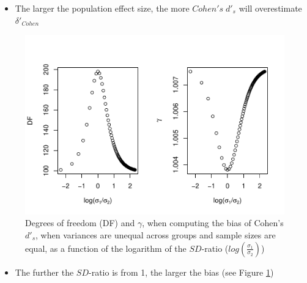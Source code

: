 \documentclass[
  man]{apa6}
\providecommand{\tightlist}{%
  \setlength{\itemsep}{0pt}\setlength{\parskip}{0pt}}
\begin{document}
\begin{itemize}
\tightlist
\item
  The larger the population effect size, the more \(Cohen's \; d'_s\) will overestimate \(\delta'_{Cohen}\)
\end{itemize}

\begin{figure}
\centering
\includegraphics{Theoretical-Bias-of-all-estimators-as-a-function-of-population-parameters_files/figure-latex/biascohendprimehetbalSDratio2-1.pdf}
\caption{\label{fig:biascohendprimehetbalSDratio2}Degrees of freedom (DF) and \(\gamma\), when computing the bias of Cohen's \(d'_s\), when variances are unequal across groups and sample sizes are equal, as a function of the logarithm of the \(SD\)-ratio (\(log \left( \frac{\sigma_1}{\sigma_2} \right)\))}
\end{figure}

\begin{itemize}
\tightlist
\item
  The further the \(SD\)-ratio is from 1, the larger the bias (see Figure \ref{fig:biascohendprimehetbalSDratio2})
\end{itemize}
\end{document}
